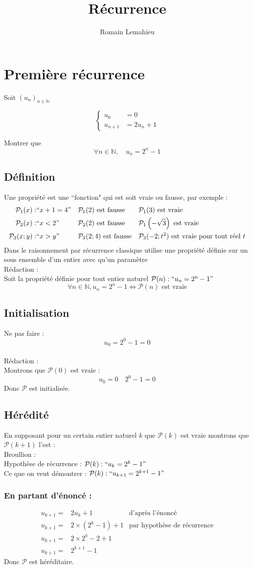 \documentclass{exam}
\title{Récurrence}
\author{Romain Lemahieu}
\newcommand*{\p}{\mathcal{P}}
\newcommand*{\n}{\mathbb{N}}
\newcommand*{\sys}[1]{
$$
\begin{cases}
#1
\end{cases}
$$
}
\begin{document}
\maketitle
\section{Première récurrence}
Soit $(u_n)_{n \in \n}$ 
\sys{
  u_0&=0\\
  u_{n+1}&=2u_n+1
}
Montrer que
$$
\forall n\in\n,
\quad
u_n=2^n-1
$$
\subsection{Définition}
Une propriété est une ``fonction" qui est soit vraie ou fausse, par exemple :
\begin{align*}
\p_1(x):&``x+1=4"
&&
\p_1(2)
\text{ est fausse}
&&
\p_1(3)
\text{ est vraie}
\\
\p_2(x):&``x<2"
&&
\p_2(2)
\text{ est fausse}
&&
\p_1\left(-\sqrt{3}\right)
\text{ est vraie}
\\
\p_3(x;y):&``x>y"
&&
\p_3(2;4)
\text{ est fausse}
&&
\p_3(-2;t^2)
\text{ est vraie pour tout réel }t
\end{align*}
Dans le raisonnement par récurrence classique utilise une propriété définie
sur un sous ensemble d'un entier avec qu'un paramètre
\\
Rédaction : 
\\
Soit la propriété définie pour tout entier naturel
$\p(n):``u_n=2^n-1"$
$$
\forall n\in\n,
u_n=2^n-1
\Leftrightarrow
\p(n) \text{ est vraie}
$$
\subsection{Initialisation}
Ne pas faire :
$$
u_0=2^0-1=0
$$
\\
Rédaction :
\\
Montrons que $\p(0)$ est vraie :
$$
u_0=0 \quad 2^0-1=0
$$
Donc $\p$ est initialisée.
\subsection{Hérédité}
En supposant pour un certain entier naturel $k$ que $\p(k)$ est vraie
montrons que $\p(k+1)$ l'est :
\\
Broullion :
\\
Hypothèse de récurrence : $\p(k):``u_k=2^k-1"$
\\
Ce que on veut démontrer : $\p(k):``u_{k+1}=2^{k+1}-1"$

\subsubsection{En partant d'énoncé :}
\begin{align*}
u_{k+1}=&2u_k+1
&
\text{d'après l'énoncé}
\\
u_{k+1}=&2\times(2^k-1)+1
&
\text{par hypothèse de récurrence}
\\
u_{k+1}=&2\times2^k-2+1
\\
u_{k+1}=&2^{k+1}-1
\end{align*}
Donc $\p$ est héréditaire.
\end{document}
